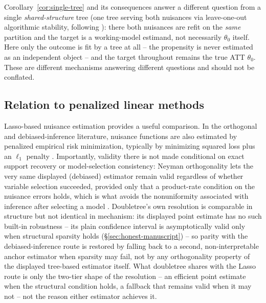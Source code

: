 \documentclass[12pt]{article}
\begin{document}
\begin{remark}
\label{rem:single-tree-distinct}
Corollary~\ref{cor:single-tree} and its consequences answer a different question from a single \emph{shared-structure} tree (one tree serving both nuisances via leave-one-out algorithmic stability, following \citet{ChenSyrgkanisAustern2022}): there both nuisances are refit on the \emph{same} partition and the target is a working-model estimand, not necessarily $\theta_0$ itself. Here only the outcome is fit by a tree at all -- the propensity is never estimated as an independent object -- and the target throughout remains the true ATT $\theta_0$. These are different mechanisms answering different questions and should not be conflated.
\end{remark}

\subsection{Relation to penalized linear methods}
\label{sec:lasso-comparison}

Lasso-based nuisance estimation provides a useful comparison. In the orthogonal and debiased-inference literature, nuisance functions are also estimated by penalized empirical risk minimization, typically by minimizing squared loss plus an $\ell_1$ penalty \citep{belloni2014,farrell2015,chernozhukov2018}. Importantly, validity there is not made conditional on exact support recovery or model-selection consistency: Neyman orthogonality lets the very same displayed (debiased) estimator remain valid regardless of whether variable selection succeeded, provided only that a product-rate condition on the nuisance errors holds, which is what avoids the nonuniformity associated with inference after selecting a model \citep{leeb2005}. Doubletree's own resolution is comparable in structure but not identical in mechanism: its displayed point estimate has no such built-in robustness -- its plain confidence interval is asymptotically valid only when structural sparsity holds (\S\ref{sec:honest-manuscript}) -- so parity with the debiased-inference route is restored by falling back to a second, non-interpretable anchor estimator when sparsity may fail, not by any orthogonality property of the displayed tree-based estimator itself. What doubletree shares with the Lasso route is only the two-tier shape of the resolution -- an efficient point estimate when the structural condition holds, a fallback that remains valid when it may not -- not the reason either estimator achieves it.
\end{document}
